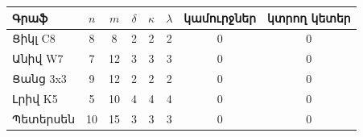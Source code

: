 \begin{tabular}{|l|c|c|c|c|c|c|c|}
\hline
Գրաֆ & $n$ & $m$ & $\delta$ & $\kappa$ & $\lambda$ & կամուրջներ & կտրող կետեր\\
\hline
Ցիկլ C8 & 8 & 8 & 2 & 2 & 2 & 0 & 0\\
\hline
Անիվ W7 & 7 & 12 & 3 & 3 & 3 & 0 & 0\\
\hline
Ցանց 3x3 & 9 & 12 & 2 & 2 & 2 & 0 & 0\\
\hline
Լրիվ K5 & 5 & 10 & 4 & 4 & 4 & 0 & 0\\
\hline
Պետերսեն & 10 & 15 & 3 & 3 & 3 & 0 & 0\\
\hline
\end{tabular}

